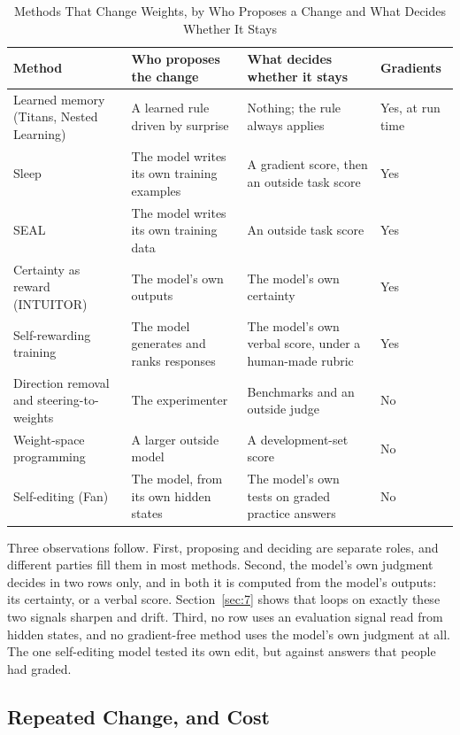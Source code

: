 \documentclass[journal]{IEEEtran}
\begin{document}
\begin{table}[!t]
\caption{Methods That Change Weights, by Who Proposes a Change and What Decides Whether It Stays}\label{tab:4}
\centering\footnotesize\renewcommand{\arraystretch}{1.15}
\begin{tabularx}{\textwidth}{@{}>{\raggedright\arraybackslash}p{}>{\raggedright\arraybackslash}X>{\raggedright\arraybackslash}Xl@{}}
\toprule
\textbf{Method} & \textbf{Who proposes the change} & \textbf{What decides whether it stays} & \textbf{Gradients} \\
\midrule
Learned memory (Titans, Nested Learning) & A learned rule driven by surprise & Nothing; the rule always applies & Yes, at run time \\
Sleep & The model writes its own training examples & A gradient score, then an outside task score & Yes \\
SEAL & The model writes its own training data & An outside task score & Yes \\
Certainty as reward (INTUITOR) & The model's own outputs & The model's own certainty & Yes \\
Self-rewarding training & The model generates and ranks responses & The model's own verbal score, under a human-made rubric & Yes \\
Direction removal and steering-to-weights & The experimenter & Benchmarks and an outside judge & No \\
Weight-space programming & A larger outside model & A development-set score & No \\
Self-editing (Fan) & The model, from its own hidden states & The model's own tests on graded practice answers & No \\
\bottomrule
\end{tabularx}
\end{table}


Three observations follow. First, proposing and deciding are separate roles, and different parties fill them in most methods. Second, the model's own judgment decides in two rows only, and in both it is computed from the model's outputs: its certainty, or a verbal score. Section~\ref{sec:7} shows that loops on exactly these two signals sharpen and drift. Third, no row uses an evaluation signal read from hidden states, and no gradient-free method uses the model's own judgment at all. The one self-editing model tested its own edit, but against answers that people had graded.

\subsection{Repeated Change, and Cost}\label{sec:6.5}
\end{document}
